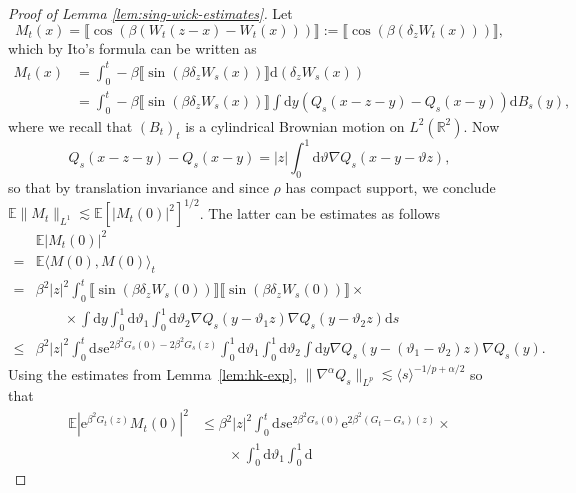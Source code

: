 \documentclass[11pt, a4paper]{scrartcl}
\numberwithin{equation}{section}
\theoremstyle{plain}
\theoremstyle{remark}
\newcommand{\assign}{:=}
\newcommand{\mathd}{\mathrm{d}}
\newcommand{\mathe}{\mathrm{e}}
\newcommand{\tmtextbf}[1]{\text{{\bfseries{#1}}}}
\begin{document}
\begin{proof}[Proof of Lemma \ref{lem:sing-wick-estimates}]
  \label{proof-lemma-NC}\tmtextbf{(N)} Let
  \[ M_t (x) = \llbracket \cos (\beta (W_t (z - x) - W_t (x))) \rrbracket
     \assign \llbracket \cos (\beta (\delta_z W_t (x))) \rrbracket, \]
  which by Ito's formula can be written as
  \[ \begin{aligned}
       M_t (x) &= \int_0^t - \beta \llbracket \sin (\beta \delta_z W_s (x))
       \rrbracket \mathd (\delta_z W_s (x))\\
       &= \int_0^t - \beta \llbracket \sin (\beta \delta_z W_s (x))
       \rrbracket \int \mathd y (Q_s (x - z - y) - Q_s (x - y)) \mathd B_s
       (y),
     \end{aligned} \]
  where we recall that $(B_t)_t$ is a cylindrical Brownian motion on $L^2
  (\mathbb{R}^2)$. Now
  \[ Q_s (x - z - y) - Q_s (x - y) = | z | \int_0^1 \mathd \vartheta \nabla
     Q_s (x - y - \vartheta z), \]
  so that by translation invariance and since $\rho$ has compact support, we conclude  $\mathbb{E} \| M_t \|_{L^1} \lesssim \mathbb{E} [| M_t (0) |^2]^{1 / 2}$.
  The latter can be estimates as follows
  \[ \begin{aligned}
       & \mathbb{E} | M_t (0) |^2\\
       = & \mathbb{E} \langle M (0), M (0) \rangle_t\\
       = & \beta^2 | z |^2 \int_0^t \llbracket \sin (\beta \delta_z W_s (0))
       \rrbracket \llbracket \sin (\beta \delta_z W_s (0)) \rrbracket \times\\
       & \qquad \times \int \mathd y \int_0^1 \mathd \vartheta_1 \int_0^1
       \mathd \vartheta_2 \nabla Q_s (y - \vartheta_1 z) \nabla Q_s (y -
       \vartheta_2 z) \mathd s\\
       \leqslant & \beta^2 | z |^2 \int_0^t \mathd s \mathe^{2 \beta^2 G_s (0)
       - 2 \beta^2 G_s (z)} \int_0^1 \mathd \vartheta_1 \int_0^1 \mathd
       \vartheta_2 \int \mathd y \nabla Q_s (y - (\vartheta_1 - \vartheta_2)
       z) \nabla Q_s (y) .
     \end{aligned} \]
  Using the estimates from Lemma~\ref{lem:hk-exp}, $\| \nabla^{\alpha} Q_s
  \|_{L^p} \lesssim \langle s \rangle^{- 1 / p + \alpha / 2}$ so that
  \[ \begin{aligned}
       \mathbb{E} | \mathe^{\beta^2 G_t (z)} M_t (0) |^2 &\leqslant  \beta^2
       | z |^2 \int_0^t \mathd s \mathe^{2 \beta^2 G_s (0)} \mathe^{2 \beta^2
       (G_t - G_s) (z)} \times\\
       & \qquad \times \int_0^1 \mathd \vartheta_1 \int_0^1 \mathd

\end{aligned}\]
\end{proof}
\end{document}

